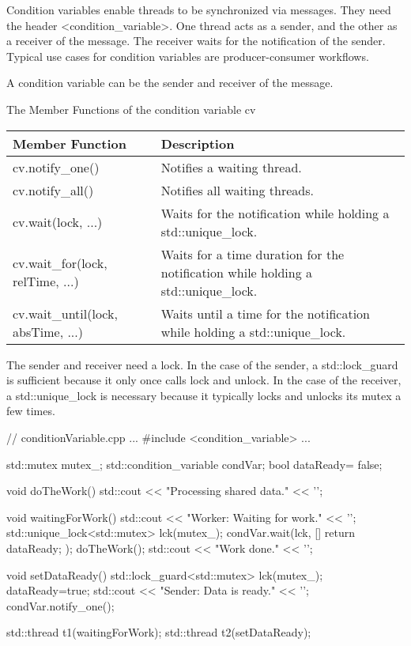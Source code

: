 Condition variables enable threads to be synchronized via messages. They need the header <condition\_variable>. One thread acts as a sender, and the other as a receiver of the message. The receiver waits for the notification of the sender. Typical use cases for condition variables are producer-consumer workflows.

A condition variable can be the sender and receiver of the message.

\begin{center}
The Member Functions of the condition variable cv
\end{center}

\begin{longtable}[c]{|l|l|}
\hline
\textbf{Member Function} & \textbf{Description}          \\ \hline
\endfirsthead
%
\endhead
%
cv.notify\_one()         & Notifies a waiting thread.    \\ \hline
cv.notify\_all()         & Notifies all waiting threads. \\ \hline
cv.wait(lock, ...)                 & Waits for the notification while holding a std::unique\_lock.                     \\ \hline
cv.wait\_for(lock, relTime, ...)   & Waits for a time duration for the notification while holding a std::unique\_lock. \\ \hline
cv.wait\_until(lock, absTime, ...) & Waits until a time for the notification while holding a std::unique\_lock.        \\ \hline
\end{longtable}


The sender and receiver need a lock. In the case of the sender, a std::lock\_guard is sufficient because it only once calls lock and unlock. In the case of the receiver, a std::unique\_lock is necessary because it typically locks and unlocks its mutex a few times.


\begin{cpp}
// conditionVariable.cpp
...
#include <condition_variable>
...

std::mutex mutex_;
std::condition_variable condVar;
bool dataReady= false;

void doTheWork(){
	std::cout << "Processing shared data." << '\n';
}

void waitingForWork(){
	std::cout << "Worker: Waiting for work." << '\n';
	std::unique_lock<std::mutex> lck(mutex_);
	condVar.wait(lck, []{ return dataReady; });
	doTheWork();
	std::cout << "Work done." << '\n';
}

void setDataReady(){
	std::lock_guard<std::mutex> lck(mutex_);
	dataReady=true;
	std::cout << "Sender: Data is ready." << '\n';
	condVar.notify_one();
}

std::thread t1(waitingForWork);
std::thread t2(setDataReady);
\end{cpp}

